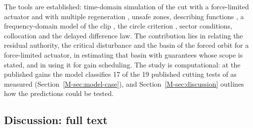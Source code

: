 The tools are established: time-domain simulation of the cut with a force-limited actuator \citep{mancisidor2015coupled,ozsoy2026robust} and with multiple regeneration \citep{tlusty1981basic}, unsafe zones, describing functions \citep{gelb1968describing}, a frequency-domain model of the clip \citep{ozsoy2025frequency}, the circle criterion \citep{zames1966inputII}, sector conditions, collocation and the delayed difference law. The contribution lies in relating the residual authority, the critical disturbance and the basin of the forced orbit for a force-limited actuator, in estimating that basin with guarantees whose scope is stated, and in using it for gain scheduling. The study is computational: at the published gains the model classifies 17 of the 19 published cutting tests of \citet{ozsoy2026robust} as measured (Section~\ref{M-sec:model-case}), and Section~\ref{M-sec:discussion} outlines how the predictions could be tested.

\subsection{Discussion: full text}\label{supp:std-discussion}

